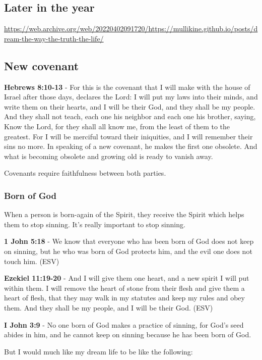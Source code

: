 \documentclass[11pt]{article}
\begin{document}
\subsection{Later in the year}
\label{sec:org0217e0f}
\url{https://web.archive.org/web/20220402091720/https://mullikine.github.io/posts/dream-the-way-the-truth-the-life/}

\subsection{New covenant}
\label{sec:org00d3750}
\textbf{Hebrews 8:10-13} - For this is the covenant that I will make with the house of Israel after those days, declares the Lord: I will put my laws into their minds, and write them on their hearts, and I will be their God, and they shall be my people.  And they shall not teach, each one his neighbor and each one his brother, saying, Know the Lord, for they shall all know me, from the least of them to the greatest.  For I will be merciful toward their iniquities, and I will remember their sins no more.  In speaking of a new covenant, he makes the first one obsolete. And what is becoming obsolete and growing old is ready to vanish away.

Covenants require faithfulness between both parties.

\subsubsection{Born of God}
\label{sec:orga6bd0e5}
When a person is born-again of the Spirit, they receive the Spirit which helps them to stop sinning. It's really important to stop sinning.

\textbf{1 John 5:18} -  We know that everyone who has been born of God does not keep on sinning, but he who was born of God protects him, and the evil one does not touch him.  (ESV)

\textbf{Ezekiel 11:19-20} - And I will give them one heart, and a new spirit I will put within them. I will remove the heart of stone from their flesh and give them a heart of flesh, that they may walk in my statutes and keep my rules and obey them. And they shall be my people, and I will be their God. (ESV)

\textbf{I John 3:9} - No one born of God makes a practice of sinning, for God's seed abides in him, and he cannot keep on sinning because he has been born of God.

But I would much like my dream life to be like the following:
\end{document}
